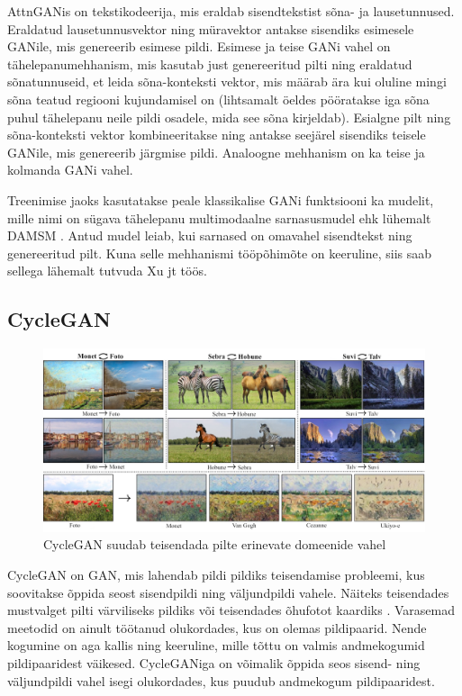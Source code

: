 \documentclass{vilgym}
\begin{document}
	AttnGANis on tekstikodeerija, mis eraldab sisendtekstist sõna- ja lausetunnused. Eraldatud lausetunnusvektor ning müravektor antakse sisendiks esimesele GANile, mis genereerib esimese pildi. Esimese ja teise GANi vahel on tähelepanumehhanism, mis kasutab just genereeritud pilti ning eraldatud sõnatunnuseid, et leida sõna-konteksti vektor, mis määrab ära kui oluline mingi sõna teatud regiooni kujundamisel on (lihtsamalt öeldes pööratakse iga sõna puhul tähelepanu neile pildi osadele, mida see sõna kirjeldab). Esialgne pilt ning sõna-konteksti vektor kombineeritakse ning antakse seejärel sisendiks teisele GANile, mis genereerib järgmise pildi. Analoogne mehhanism on ka teise ja kolmanda GANi vahel.

	Treenimise jaoks kasutatakse peale klassikalise GANi funktsiooni ka mudelit, mille nimi on sügava tähelepanu multimodaalne sarnasusmudel ehk lühemalt DAMSM . Antud mudel leiab, kui sarnased on omavahel sisendtekst ning genereeritud pilt. Kuna selle mehhanismi tööpõhimõte on keeruline, siis saab sellega lähemalt tutvuda Xu jt töös. \parencite{attngan}

	\subsection{CycleGAN}
	\begin{figure}
		\centering
			\includegraphics[width=\linewidth]{images/cyclegan_est.png}
			\caption{CycleGAN suudab teisendada pilte erinevate domeenide vahel \parencite{cyclegan}}
			\label{fig:cyclegan}
	\end{figure}

	CycleGAN on GAN, mis lahendab pildi pildiks teisendamise probleemi, kus soovitakse õppida seost sisendpildi ning väljundpildi vahele. Näiteks teisendades mustvalget pilti värviliseks pildiks või teisendades õhufotot kaardiks . Varasemad meetodid on ainult töötanud olukordades, kus on olemas pildipaarid. Nende kogumine on aga kallis ning keeruline, mille tõttu on valmis andmekogumid pildipaaridest väikesed. CycleGANiga on võimalik õppida seos sisend- ning väljundpildi vahel isegi olukordades, kus puudub andmekogum pildipaaridest. 
\end{document}
